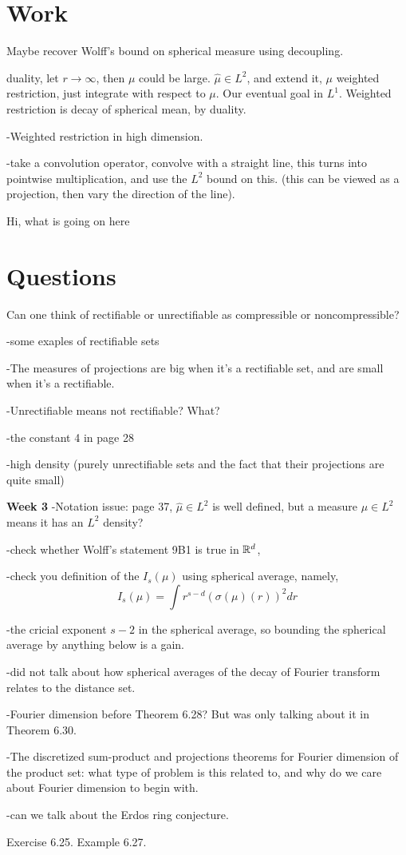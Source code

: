 \chapter{Work}
Maybe recover Wolff's bound on spherical measure using decoupling. 

duality, let $r\to\infty$, then $\mu$  could be large.
$\hat{\mu}\in L^2$, and extend it,  $\mu$ weighted restriction, just integrate with respect to $\mu$. Our eventual goal in $L^1$. Weighted restriction is decay of spherical mean, by duality.

-Weighted restriction in high dimension.

-take a convolution operator, convolve with a straight line, this turns into pointwise multiplication, and use the $L^2$ bound on this. (this can be viewed as a projection, then vary the direction of the line).

Hi, what is going on here
\chapter{Questions}

Can one think of rectifiable or unrectifiable as compressible or noncompressible?

-some exaples of rectifiable sets

-The measures of projections are big when it's a rectifiable set, and are small when it's a rectifiable.

-Unrectifiable means not rectifiable? What?


-the constant 4 in page 28

-high density (purely unrectifiable sets and the fact that their projections are quite small)


\textbf{Week 3}
-Notation issue: page 37, $\hat{\mu}\in L^2$ is well defined, but a measure $\mu\in L^2$ means it has an $L^2$ density?

-check whether Wolff's statement 9B1 is true in $\mathbb{R}^d$,

-check you definition of the $I_s(\mu)$ using spherical average, namely, 
\begin{equation*}
    I_s(\mu)=\int r^{s-d}(\sigma(\mu)(r))^2dr
\end{equation*}

-the cricial exponent $s-2$ in the spherical average, so bounding the spherical average by anything below is a gain.

-did not talk about how spherical averages of the decay of Fourier transform relates to the distance set.

-Fourier dimension before Theorem 6.28? But was only talking about it in Theorem 6.30.

-The discretized sum-product and projections theorems for Fourier dimension of the product set: what type of problem is this related to, and why do we care about Fourier dimension to begin with.

-can we talk about the Erdos ring conjecture.




Exercise 6.25. 
Example 6.27.

